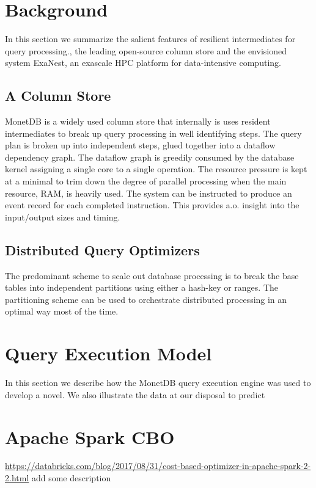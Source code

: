 \section{Background}
\label{Background}
In this section we summarize the salient features of resilient intermediates
for query processing., the leading open-source  column store and the envisioned
system ExaNest, an exascale HPC platform for data-intensive computing.

\subsection{A Column Store}
MonetDB is a widely used column store that internally is uses resident
intermediates to break up query processing in well identifying steps.
The query plan is broken up into independent steps, glued together into a
dataflow dependency graph.  The dataflow graph is greedily consumed by the
database kernel assigning a single core to a single operation.
The resource pressure is kept at a minimal to trim down the degree  of parallel
processing when the main resource, RAM, is heavily used.
The system can be instructed to produce an event record for each completed instruction.
This provides a.o. insight into the input/output sizes and timing.

\subsection{Distributed Query Optimizers}
The predominant scheme to scale out database processing is to break the base
tables into independent partitions using either a hash-key or ranges.
The partitioning scheme can be used to orchestrate distributed processing
in an optimal way most of the time.

\section{Query Execution Model}
In this section we describe how the MonetDB query execution engine was used
 to develop a novel. We also illustrate the data at our disposal to predict

\section{Apache Spark CBO}
\href{https://databricks.com/blog/2017/08/31/cost-based-optimizer-in-apache-spark-2-2.html}{https://databricks.com/blog/2017/08/31/cost-based-optimizer-in-apache-spark-2-2.html}
add some description


